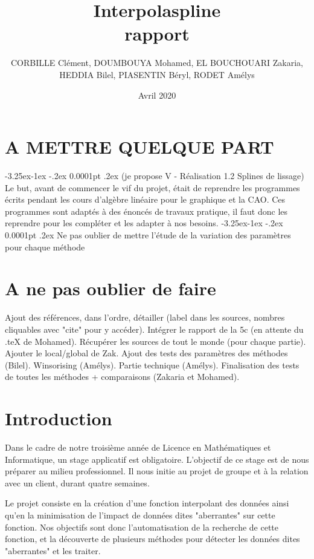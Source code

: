 \documentclass[a4paper,12pt]{article} %
\title{\textbf{Interpolaspline}\\ rapport}
\author{CORBILLE Clément, DOUMBOUYA Mohamed, EL BOUCHOUARI Zakaria, \\HEDDIA Bilel, PIASENTIN Béryl, RODET Amélys }
\date{Avril 2020}
\makeatletter
\renewcommand\paragraph{\@startsection{paragraph}{4}{\z@}%
                                      {-3.25ex\@plus -1ex \@minus -.2ex}%
                                      {0.0001pt \@plus .2ex}%
                                      {\normalfont\normalsize\bfseries}}
\makeatother
\begin{document}
\maketitle
\tableofcontents

\part{A METTRE QUELQUE PART}
\paragraph{} (je propose V - Réalisation 1.2  Splines de lissage) Le but, avant de commencer le vif du projet, était de reprendre les programmes écrits pendant les cours d'algèbre linéaire pour le graphique et la CAO. Ces programmes sont adaptés à des énoncés de travaux pratique, il faut donc les reprendre pour les compléter et les adapter à nos besoins.
\paragraph{} Ne pas oublier de mettre l'étude de la variation des paramètres pour chaque méthode

\part{A ne pas oublier de faire}
Ajout des références, dans l'ordre, détailler (label dans les sources, nombres cliquables avec "cite" pour y accéder). Intégrer le rapport de la 5c (en attente du .teX de Mohamed). Récupérer les sources de tout le monde (pour chaque partie). Ajouter le local/global de Zak. Ajout des tests des paramètres des méthodes (Bilel). Winsorising (Amélys). Partie technique (Amélys). Finalisation des tests de toutes les méthodes + comparaisons (Zakaria et Mohamed).

\renewcommand\partname{}
\part{Introduction}
    Dans le cadre de notre troisième année de Licence en Mathématiques et Informatique, un stage applicatif est obligatoire. L'objectif de ce stage est de nous préparer au milieu professionnel. Il nous initie au projet de groupe et à la relation avec un client, durant quatre semaines.

    Le projet consiste en la création d'une fonction interpolant des données ainsi qu'en la minimisation de l'impact de données dites "aberrantes" sur cette fonction. Nos objectifs sont donc l'automatisation de la recherche de cette fonction, et la découverte de plusieurs méthodes pour détecter les données dites "aberrantes" et les traiter.\\
\end{document}
